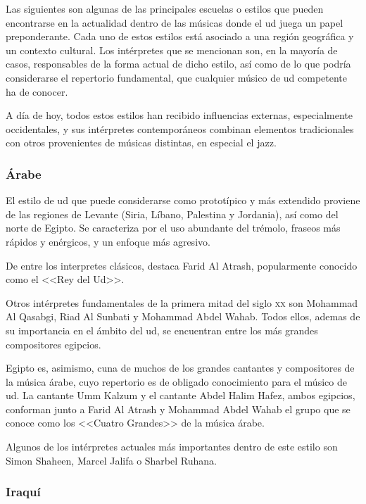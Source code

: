 Las siguientes son algunas de las principales escuelas o estilos que pueden encontrarse en la actualidad dentro de las músicas donde el ud juega un papel preponderante. Cada uno de estos estilos está asociado a una región geográfica y un contexto cultural. Los intérpretes que se mencionan son, en la mayoría de casos, responsables de la forma actual de dicho estilo, así como de lo que podría considerarse el repertorio fundamental, que cualquier músico de ud competente ha de conocer.

A día de hoy, todos estos estilos han recibido influencias externas, especialmente occidentales, y sus intérpretes contemporáneos combinan elementos tradicionales con otros provenientes de músicas distintas, en especial el jazz.


\subsubsection{Árabe}

El estilo de ud que puede considerarse como prototípico y más extendido proviene de las regiones de Levante (Siria, Líbano, Palestina y Jordania), así como del norte de Egipto. Se caracteriza por el uso abundante del trémolo, fraseos más rápidos y enérgicos, y un enfoque más agresivo.

De entre los interpretes clásicos, destaca Farid Al Atrash, popularmente conocido como el <<Rey del Ud>>.

Otros intérpretes fundamentales de la primera mitad del siglo \textsc{xx} son Mohammad Al Qasabgi, Riad Al Sunbati y Mohammad Abdel Wahab. Todos ellos, ademas de su importancia en el ámbito del ud, se encuentran entre los más grandes compositores egipcios.

Egipto es, asimismo, cuna de muchos de los grandes cantantes y compositores de la música árabe, cuyo repertorio es de obligado conocimiento para el músico de ud. La cantante Umm Kalzum y el cantante Abdel Halim Hafez, ambos egipcios, conforman junto a Farid Al Atrash y Mohammad Abdel Wahab el grupo que se conoce como los <<Cuatro Grandes>> de la música árabe.

Algunos de los intérpretes actuales más importantes dentro de este estilo son Simon Shaheen, Marcel Jalifa o Sharbel Ruhana.


\subsubsection{Iraquí}

